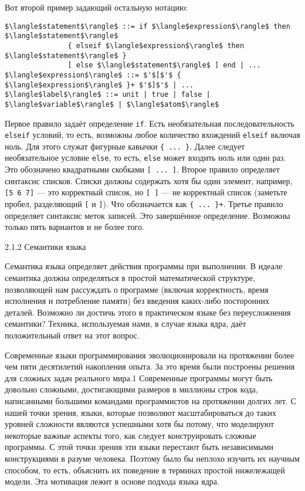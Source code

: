 Вот второй пример задающий остальную нотацию:

\begin{lstlisting}
$\langle$statement$\rangle$ ::= if $\langle$expression$\rangle$ then $\langle$statement$\rangle$
               { elseif $\langle$expression$\rangle$ then $\langle$statement$\rangle$ }
               [ else $\langle$statement$\rangle$ ] end | ...
$\langle$expression$\rangle$ ::= $'$[$'$ { $\langle$expression$\rangle$ }+ $'$]$'$ | ...
$\langle$label$\rangle$ ::= unit | true | false | $\langle$variable$\rangle$ | $\langle$atom$\rangle$
\end{lstlisting}

Первое правило задаёт определение \lstinline|if|. Есть необязательная последовательность \lstinline|elseif| условий, то есть, возможны любое количество вхождений \lstinline|elseif| включая ноль. Для этого служат фигурные кавычки \lstinline|{ ... }|. Далее следует необязательное условие \lstinline|else|, то есть, \lstinline|else| может входить ноль или один раз. Это обозначено квадратными скобками \lstinline|[ ... ]|. Второе правило определяет синтаксис списков. Списки должны содержать хотя бы один элемент, например, \lstinline|[5 6 7]| --- это корректный список, но \lstinline|[ ]| --- не корректный список (заметьте пробел, разделяющий \lstinline|[| и \lstinline|]|). Что обозначается как \lstinline|{ ... }+|. Третье правило определяет синтаксис меток записей. Это завершённое определение. Возможны только пять вариантов и не более того.

2.1.2 Семантики языка

Семантика языка определяет действия программы при выполнении. В идеале семантика должна определяться в простой математической структуре, позволяющей нам рассуждать о программе (включая корректность, время исполнения и потребление памяти) без введения каких-либо посторонних деталей. Возможно ли достичь этого в практическом языке без переусложнения семантики? Техника, используемая нами, в случае языка ядра, даёт положительный ответ на этот вопрос.

Современные языки программирования эволюционировали на протяжении более чем пяти десятилетий накопления опыта. За это время были построены решения для сложных задач реального мира.1 Современные программы могут быть довольно сложными, достигающими размеров в миллионы строк кода, написанными большими командами программистов на протяжении долгих лет. С нашей точки зрения, языки, которые позволяют масштабироваться до таких уровней сложности являются успешными хотя бы потому, что моделируют некоторые важные аспекты того, как следует конструировать сложные программы. С этой точки зрения эти языки перестают быть независимыми конструкциями в разуме человека. Поэтому было бы неплохо изучить их научным способом, то есть, объяснить их поведение в терминах простой нижележащей модели. Эта мотивация лежит в основе подхода языка ядра.

